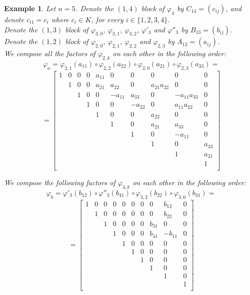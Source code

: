 \documentclass{article}
\newtheorem{example}[theorem]{Example}
\begin{document}
\begin{example}
Let $n=5$.
Denote the $(1,4)$ block of $\varphi_4$ by $C_{14}=(c_{ij})$, and denote $c_{i1}=c_i$ where $c_i\in{K}$, for every $i\in\{1,2,3,4\}$.\\
Denote the $(1,3)$ block of $\varphi_{3,0}$, $\varphi_{3,1}$, $\varphi_{3,2}$, $\varphi'_3$ and $\varphi''_3$ by $B_{13}=(b_{ij})$.\\
Denote the $(1,2)$ block of $\varphi_{2,0}$, $\varphi_{2,1}$, $\varphi_{2,2}$ and $\varphi_{2,3}$ by $A_{12}=(a_{ij})$.\\

We compose all the factors of $\varphi_{2,k}$ on each other in the following order:
\[
  \varphi_a=\varphi_{2,1}(a_{11})\circ\varphi_{2,2}(a_{22})\circ\varphi_{2,0}(a_{21})\circ\varphi_{2,3}(a_{33})=\]\[=\begin{bmatrix}
    1 & 0 & 0 & 0 & a_{11} & 0 & 0 & 0 & 0 & 0 \\
    & 1 & 0 & 0 & a_{21} & a_{22} & 0 & a_{21}a_{22} & 0 & 0 \\
    & & 1 & 0 & 0 & -a_{11} & a_{33} & 0 & -a_{11}a_{33} & 0 \\
    & & & 1 & 0 & 0 & -a_{22} & 0 & a_{11}a_{22} & 0 \\
    & & & & 1 & 0 & 0 & a_{22} & 0 & 0 \\
    & & & & & 1 & 0 & a_{21} & a_{33} & 0\\
    & & & & & & 1 & 0 & -a_{11} & 0 \\
    & & & & & & & 1 & 0 & a_{33} \\
    & & & & & & & & 1 & a_{21} \\
    & & & & & & & & & 1 \\
  \end{bmatrix}
\]

We compose the following factors of $\varphi_{3,k}$ on each other in the following order:
\[
  \varphi_b=\varphi'_3(b_{12})\circ\varphi''_3(b_{41})\circ\varphi_{3,2}(b_{22})\circ\varphi_{3,0}(b_{31})=\]\[=\begin{bmatrix}
    1 & 0 & 0 & 0 & 0 & 0 & 0 & 0 & b_{12} & 0 \\
    & 1 & 0 & 0 & 0 & 0 & 0 & 0 & b_{22} & 0 \\
    & & 1 & 0 & 0 & 0 & 0 & b_{31} & 0 & 0 \\
    & & & 1 & 0 & 0 & 0 & b_{41} & -b_{11} & 0 \\
    & & & & 1 & 0 & 0 & 0 & 0 & 0 \\
    & & & & & 1 & 0 & 0 & 0 & 0\\
    & & & & & & 1 & 0 & 0 & 0 \\
    & & & & & & & 1 & 0 & 0 \\
    & & & & & & & & 1 & 0 \\
    & & & & & & & & & 1 \\
  \end{bmatrix}
\]


\end{example}
\end{document}
